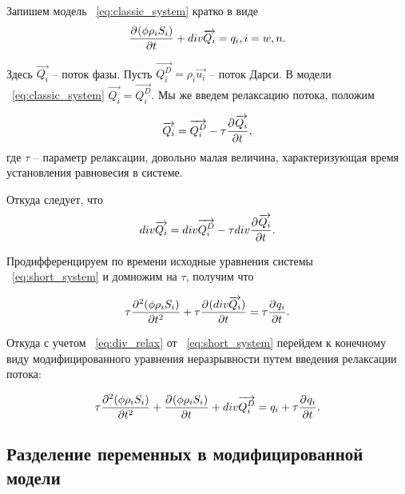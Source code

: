 Запишем модель ~\eqref{eq:classic_system} кратко в виде
\begin{equation} \label{eq:short_system}
   \pd{(\phi \rho_i S_i)}{t} + div \overrightarrow{Q_i} = q_i, i = w,n.
\end{equation}

Здесь $\overrightarrow{Q_i}$ -- поток фазы.
Пусть $\overrightarrow{Q_i^D} = \rho_i \overrightarrow{u_i}$ -- поток Дарси.
В модели ~\eqref{eq:classic_system} $\overrightarrow{Q_i} = \overrightarrow{Q_i^D}$.
Мы же введем релаксацию потока, положим 

\begin{equation}
 \overrightarrow{Q_i} = \overrightarrow{Q_i^D} - \tau \pd{\overrightarrow{Q_i}}{t},
\end{equation}
где $\tau$ -- параметр релаксации, довольно малая величина, характеризующая время установления равновесия в системе.

Откуда следует, что
\begin{equation} \label{eq:div_relax}
 div\overrightarrow{Q_i} = div\overrightarrow{Q_i^D} - \tau div\pd{\overrightarrow{Q_i}}{t}.
\end{equation}

Продифференцируем по времени исходные уравнения системы ~\eqref{eq:short_system} и домножим на $\tau$, получим что

\begin{equation}
  \tau \pd[2]{(\phi \rho_i S_i)}{t} + \tau \pd{(div \overrightarrow{Q_i})}{t} = \tau \pd{q_i}{t}.
\end{equation}

Откуда с учетом ~\eqref{eq:div_relax} от ~\eqref{eq:short_system} перейдем к конечному виду модифицированного уравнения неразрывности
путем введения релаксации потока:

\begin{equation} \label{eq:mod_system}
  \tau \pd[2]{(\phi \rho_i S_i)}{t} + \pd{(\phi \rho_i S_i)}{t} + div \overrightarrow{Q_i^D} = q_i + \tau \pd{q_i}{t}.
\end{equation}



\subsection{Разделение переменных в модифицированной модели}

